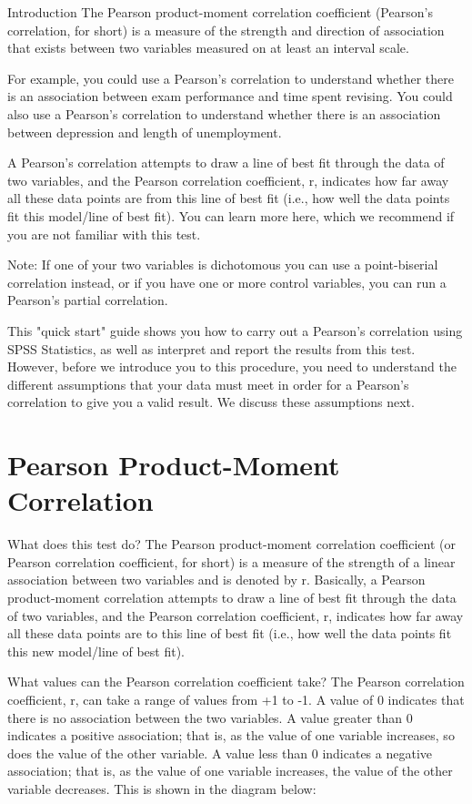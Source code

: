\documentclass[]{article}
\begin{document}
Introduction
The Pearson product-moment correlation coefficient (Pearson’s correlation, for short) is a measure of the strength and direction of association that exists between two variables measured on at least an interval scale.

For example, you could use a Pearson’s correlation to understand whether there is an association between exam performance and time spent revising. You could also use a Pearson's correlation to understand whether there is an association between depression and length of unemployment.

A Pearson’s correlation attempts to draw a line of best fit through the data of two variables, and the Pearson correlation coefficient, r, indicates how far away all these data points are from this line of best fit (i.e., how well the data points fit this model/line of best fit). You can learn more here, which we recommend if you are not familiar with this test.

Note: If one of your two variables is dichotomous you can use a point-biserial correlation instead, or if you have one or more control variables, you can run a Pearson's partial correlation.

This "quick start" guide shows you how to carry out a Pearson's correlation using SPSS Statistics, as well as interpret and report the results from this test. However, before we introduce you to this procedure, you need to understand the different assumptions that your data must meet in order for a Pearson's correlation to give you a valid result. We discuss these assumptions next.

\section{Pearson Product-Moment Correlation}

What does this test do?
The Pearson product-moment correlation coefficient (or Pearson correlation coefficient, for short) is a measure of the strength of a linear association between two variables and is denoted by r. Basically, a Pearson product-moment correlation attempts to draw a line of best fit through the data of two variables, and the Pearson correlation coefficient, r, indicates how far away all these data points are to this line of best fit (i.e., how well the data points fit this new model/line of best fit).

What values can the Pearson correlation coefficient take?
The Pearson correlation coefficient, r, can take a range of values from +1 to -1. A value of 0 indicates that there is no association between the two variables. A value greater than 0 indicates a positive association; that is, as the value of one variable increases, so does the value of the other variable. A value less than 0 indicates a negative association; that is, as the value of one variable increases, the value of the other variable decreases. This is shown in the diagram below:
\end{document}
